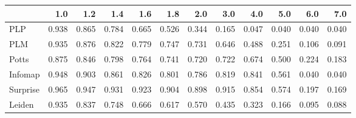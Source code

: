 \begin{tabular}{lrrrrrrrrrrr}
\toprule
{} &   1.0 &   1.2 &   1.4 &   1.6 &   1.8 &   2.0 &   3.0 &   4.0 &   5.0 &   6.0 &   7.0 \\
\midrule
PLP      & 0.938 & 0.865 & 0.784 & 0.665 & 0.526 & 0.344 & 0.165 & 0.047 & 0.040 & 0.040 & 0.040 \\
PLM      & 0.935 & 0.876 & 0.822 & 0.779 & 0.747 & 0.731 & 0.646 & 0.488 & 0.251 & 0.106 & 0.091 \\
Potts    & 0.875 & 0.846 & 0.798 & 0.764 & 0.741 & 0.720 & 0.722 & 0.674 & 0.500 & 0.224 & 0.183 \\
Infomap  & 0.948 & 0.903 & 0.861 & 0.826 & 0.801 & 0.786 & 0.819 & 0.841 & 0.561 & 0.040 & 0.040 \\
Surprise & 0.965 & 0.947 & 0.931 & 0.923 & 0.904 & 0.898 & 0.915 & 0.854 & 0.574 & 0.197 & 0.169 \\
Leiden   & 0.935 & 0.837 & 0.748 & 0.666 & 0.617 & 0.570 & 0.435 & 0.323 & 0.166 & 0.095 & 0.088 \\
\bottomrule
\end{tabular}
